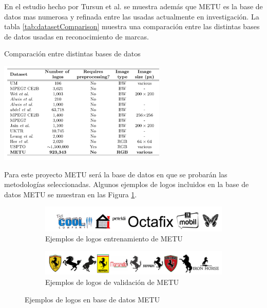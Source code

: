 \documentclass[conference]{IEEEtran}
\begin{document}
En el estudio hecho por Tursun et al. \cite{metuV2} se muestra además que METU es la base de datos mas numerosa y refinada entre las usadas actualmente en investigación. La tabla \ref{tab:datasetComparison} muestra una comparación entre las distintas bases de datos usadas en reconocimiento de marcas.
\begin{table}[h!]
	\caption{Comparación entre distintas bases de datos}
	\includegraphics[width=8cm]{images/comparasciondataset}
	\label{tab:datasetComparison}
\end{table}

Para este proyecto METU será la base de datos en que se probarán las metodologías seleccionadas. Algunos ejemplos de logos incluidos en la base de datos METU se muestran en las Figura \ref{fig:logosMatu}.

\begin{figure}[h!]
\centering
	\begin{subfigure}[b]{0.8\linewidth}
		\includegraphics[width=\linewidth]{images/metudataset.png}
		\caption{Ejemplos de logos entrenamiento de METU}
	\end{subfigure}

  	\begin{subfigure}[b]{0.8\linewidth}
		\includegraphics[width=\linewidth]{images/queriesmetu2}
		\caption{Ejemplos de logos de validación de METU}
  	 \end{subfigure}
  	\caption{Ejemplos de logos en base de datos METU}
  	\label{fig:logosMatu}
\end{figure} 
\end{document}

